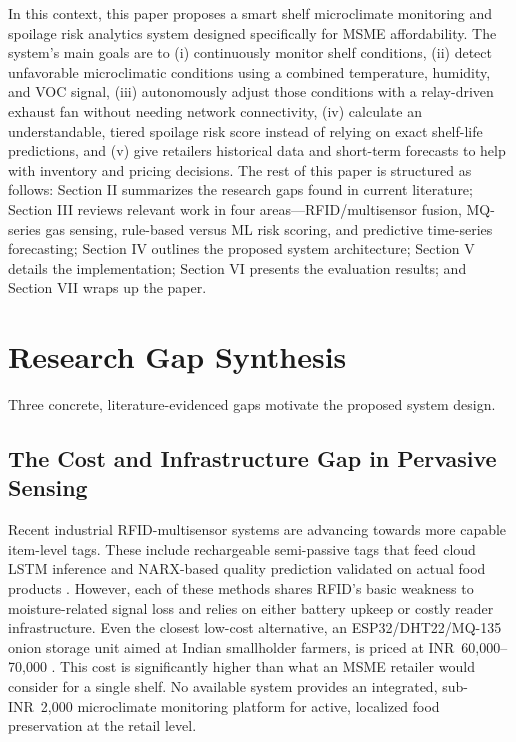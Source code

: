 \documentclass[conference]{IEEEtran}
\newcommand{\INR}{INR~}
\begin{document}
In this context, this paper proposes a smart shelf microclimate monitoring and spoilage risk analytics system designed specifically for MSME affordability. The system's main goals are to (i) continuously monitor shelf conditions, (ii) detect unfavorable microclimatic conditions using a combined temperature, humidity, and VOC signal, (iii) autonomously adjust those conditions with a relay-driven exhaust fan without needing network connectivity, (iv) calculate an understandable, tiered spoilage risk score instead of relying on exact shelf-life predictions, and (v) give retailers historical data and short-term forecasts to help with inventory and pricing decisions. The rest of this paper is structured as follows: Section II summarizes the research gaps found in current literature; Section III reviews relevant work in four areas—RFID/multisensor fusion, MQ-series gas sensing, rule-based versus ML risk scoring, and predictive time-series forecasting; Section IV outlines the proposed system architecture; Section V details the implementation; Section VI presents the evaluation results; and Section VII wraps up the paper.
\section{Research Gap Synthesis}

Three concrete, literature-evidenced gaps motivate the proposed system
design.

\subsection{The Cost and Infrastructure Gap in Pervasive Sensing}
Recent industrial RFID-multisensor systems are advancing towards more capable item-level tags. These include rechargeable semi-passive tags that feed cloud LSTM inference \cite{cao2026} and NARX-based quality prediction validated on actual food products \cite{song2024sensors}. However, each of these methods shares RFID's basic weakness to moisture-related signal loss \cite{claucherty2024} and relies on either battery upkeep or costly reader infrastructure. Even the closest low-cost alternative, an ESP32/DHT22/MQ-135 onion storage unit aimed at Indian smallholder farmers, is priced at \INR{}60,000--70,000 \cite{kumar2026}. This cost is significantly higher than what an MSME retailer would consider for a single shelf. No available system provides an integrated, sub-\INR{}2,000 microclimate monitoring platform for active, localized food preservation at the retail level.
\end{document}
